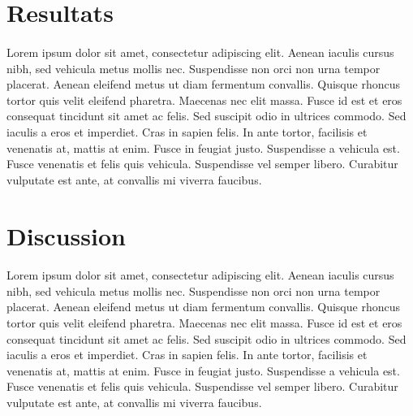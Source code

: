 \documentclass[11pt]{bioinlab}
\begin{document}
\section{Resultats}
\paragraph{}Lorem ipsum dolor sit amet, consectetur adipiscing elit. Aenean iaculis cursus nibh, sed vehicula metus mollis nec. Suspendisse non orci non urna tempor placerat. Aenean eleifend metus ut diam fermentum convallis. Quisque rhoncus tortor quis velit eleifend pharetra. Maecenas nec elit massa. Fusce id est et eros consequat tincidunt sit amet ac felis. Sed suscipit odio in ultrices commodo. Sed iaculis a eros et imperdiet. Cras in sapien felis. In ante tortor, facilisis et venenatis at, mattis at enim. Fusce in feugiat justo. Suspendisse a vehicula est. Fusce venenatis et felis quis vehicula. Suspendisse vel semper libero. Curabitur vulputate est ante, at convallis mi viverra faucibus. 
\newpage
\section{Discussion}
\paragraph{}Lorem ipsum dolor sit amet, consectetur adipiscing elit. Aenean iaculis cursus nibh, sed vehicula metus mollis nec. Suspendisse non orci non urna tempor placerat. Aenean eleifend metus ut diam fermentum convallis. Quisque rhoncus tortor quis velit eleifend pharetra. Maecenas nec elit massa. Fusce id est et eros consequat tincidunt sit amet ac felis. Sed suscipit odio in ultrices commodo. Sed iaculis a eros et imperdiet. Cras in sapien felis. In ante tortor, facilisis et venenatis at, mattis at enim. Fusce in feugiat justo. Suspendisse a vehicula est. Fusce venenatis et felis quis vehicula. Suspendisse vel semper libero. Curabitur vulputate est ante, at convallis mi viverra faucibus.
\end{document}
